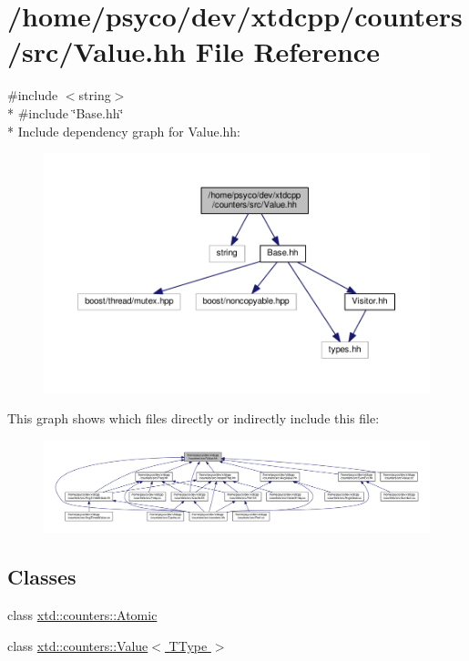 \hypertarget{Value_8hh}{}\section{/home/psyco/dev/xtdcpp/counters/src/\+Value.hh File Reference}
\label{Value_8hh}
{\ttfamily \#include $<$string$>$}\\*
{\ttfamily \#include \char`\"{}Base.\+hh\char`\"{}}\\*
Include dependency graph for Value.\+hh\+:
\nopagebreak
\begin{figure}[H]
\begin{center}
\leavevmode
\includegraphics[width=350pt]{Value_8hh__incl}
\end{center}
\end{figure}
This graph shows which files directly or indirectly include this file\+:
\nopagebreak
\begin{figure}[H]
\begin{center}
\leavevmode
\includegraphics[width=350pt]{Value_8hh__dep__incl}
\end{center}
\end{figure}
\subsection*{Classes}
\begin{DoxyCompactItemize}
\item 
class \hyperlink{classxtd_1_1counters_1_1Atomic}{xtd\+::counters\+::\+Atomic}
\item 
class \hyperlink{classxtd_1_1counters_1_1Value}{xtd\+::counters\+::\+Value$<$ T\+Type $>$}
\end{DoxyCompactItemize}
